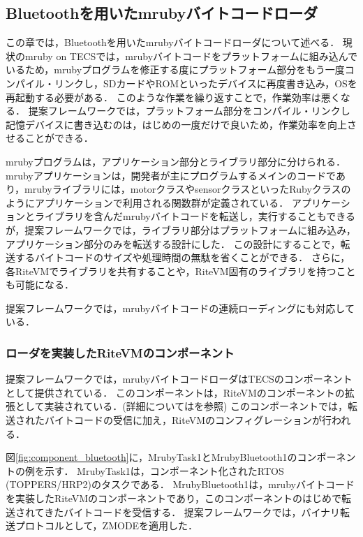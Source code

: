 \documentclass[submit,techrep]{ipsj}
\begin{document}
\subsection{Bluetoothを用いたmrubyバイトコードローダ}
\label{sec:mruby bytecode loader using Bluetooth}
この章では，Bluetoothを用いたmrubyバイトコードローダについて述べる．
現状のmruby on TECSでは，mrubyバイトコードをプラットフォームに組み込んでいるため，mrubyプログラムを修正する度にプラットフォーム部分をもう一度コンパイル・リンクし，SDカードやROMといったデバイスに再度書き込み，OSを再起動する必要がある．
このような作業を繰り返すことで，作業効率は悪くなる．
提案フレームワークでは，プラットフォーム部分をコンパイル・リンクし記憶デバイスに書き込むのは，はじめの一度だけで良いため，作業効率を向上させることができる．

mrubyプログラムは，アプリケーション部分とライブラリ部分に分けられる．
mrubyアプリケーションは，開発者が主にプログラムするメインのコードであり，mrubyライブラリには，motorクラスやsensorクラスといったRubyクラスのようにアプリケーションで利用される関数群が定義されている．
アプリケーションとライブラリを含んだmrubyバイトコードを転送し，実行することもできるが，提案フレームワークでは，ライブラリ部分はプラットフォームに組み込み，アプリケーション部分のみを転送する設計にした．
この設計にすることで，転送するバイトコードのサイズや処理時間の無駄を省くことができる．
さらに，各RiteVMでライブラリを共有することや，RiteVM固有のライブラリを持つことも可能になる．

提案フレームワークでは，mrubyバイトコードの連続ローディングにも対応している．

\subsubsection{ローダを実装したRiteVMのコンポーネント}
提案フレームワークでは，mrubyバイトコードローダはTECSのコンポーネントとして提供されている．
このコンポーネントは，RiteVMのコンポーネントの拡張として実装されている．(詳細については\cite{par:mrubyonTECS}を参照)
このコンポーネントでは，転送されたバイトコードの受信に加え，RiteVMのコンフィグレーションが行われる．

図\ref{fig:component_bluetooth}に，MrubyTask1とMrubyBluetooth1のコンポーネントの例を示す．
MrubyTask1は，コンポーネント化されたRTOS (TOPPERS/HRP2\cite{par:HRP2})のタスクである．
MrubyBluetooth1は，mrubyバイトコードを実装したRiteVMのコンポーネントであり，このコンポーネントのはじめで転送されてきたバイトコードを受信する．
提案フレームワークでは，バイナリ転送プロトコルとして，ZMODEを適用した．
\end{document}
